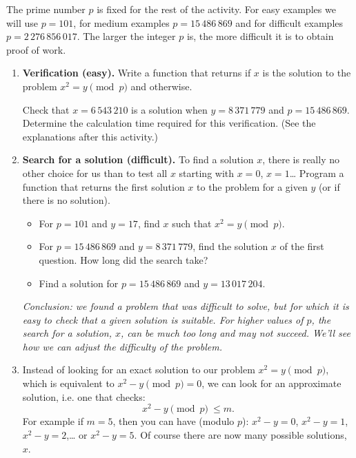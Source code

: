 \documentclass[11pt,class=report,crop=false]{standalone}
\begin{document}
\begin{activite}
The prime number $p$ is fixed for the rest of the activity. 
For easy examples we will use $p = 101$, for medium examples $p = 15\,486\,869$ and for difficult examples $p = 2\,276\,856\,017$. The larger the integer $p$ is, the more difficult it is to obtain proof of work.

\begin{enumerate}
  \item \textbf{Verification (easy).} 
  Write a  function that returns  if $x$ is the solution to the problem $x^2 = y \pmod{p}$ and  otherwise.
  
  Check that $x = 6\,543\,210$ is a solution when $y = 8\,371\,779$ and $p = 15\,486\,869$. Determine the calculation time required for this verification. (See the explanations after this activity.)
  
  \item \textbf{Search for a solution (difficult).} To find a solution $x$, there is really no other choice for us than to test all $x$ starting with $x=0$, $x=1$\ldots{}
Program a  function that returns the first solution $x$ to the problem for a given $y$ (or  if there is no solution).

  \begin{itemize}
    \item For $p = 101$ and $y=17$, find $x$ such that $x^2 = y \pmod{p}$. 
    \item For $p = 15\,486\,869$ and $y = 8\,371\,779$, find the solution $x$ of the first question. How long did the search take? 
    
    \item Find a solution for $p = 15\,486\,869$ and $y = 13\,017\,204$.    
   \end{itemize}


\medskip

\emph{Conclusion: we found a problem that was difficult to solve, but for which it is easy to check that a given solution is suitable. For higher values of $p$, the search for a solution, $x$, can be much too long and may not succeed. We'll see how we can adjust the difficulty of the problem.}


	\item Instead of looking for an exact solution to our problem $x^2 = y \pmod{p}$, which is equivalent to $x^2-y \pmod{p} = 0$, we can look for an approximate solution, i.e. one that checks: $$x^2 - y \pmod{p} \ \le m.$$
	For example if $m=5$, then you can have (modulo $p$): $x^2 - y = 0$, $x^2 - y = 1$,
	$x^2-y = 2$,\ldots{} or $x^2-y=5$. 
	Of course there are now many possible solutions, $x$.
	

\end{enumerate}
\end{activite}
\end{document}

